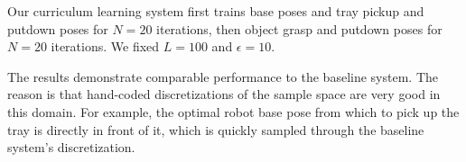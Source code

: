 Our curriculum learning system first trains base poses and tray pickup and putdown poses for
$N = 20$ iterations, then object grasp and putdown poses for $N = 20$ iterations. We fixed $L = 100$ and $\epsilon = 10$.

The results demonstrate comparable performance to the baseline system. The reason is that
hand-coded discretizations of the sample space are very good in this domain. For example, the optimal
robot base pose from which to pick up the tray is directly in front of it, which is quickly sampled through
the baseline system's discretization.